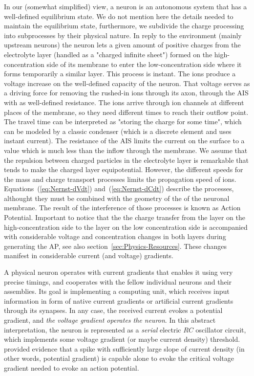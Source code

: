 In our (somewhat simplified) view, a neuron is an autonomous  system that has a well-defined equilibrium state. We do not mention here the details needed to maintain the equilibrium state,
furthermore, we subdivide the charge processing into subprocesses by their physical nature.
In reply to the environment (mainly upstream neurons) the neuron lets a given amount of positive charges from the electrolyte layer (handled as a "charged infinite sheet")
formed on the high-concentration side of its membrane to enter the low-concentration side where it forms temporarily a similar layer. This process is instant.
The ions produce a voltage increase on the well-defined
capacity of the neuron. That voltage serves as a driving force 
for removing the rushed-in ions through its axon, through the 
\gls{AIS}
with as well-defined resistance. The ions arrive through
ion channels at different places of the membrane, so they need
different times to reach their outflow point.
The travel time can be interpreted as "storing the charge for some time", which can be modeled by a classic condenser (which is a discrete element and uses instant current).
The resistance 
of the
\gls{AIS}
limits the current on the surface to a value which is much less
than the inflow through the membrane. We assume that the repulsion between charged particles in the electrolyte layer
is remarkable that tends to make the charged layer equipotential.
However, the different speeds for the mass and charge transport processes limits the propagation speed of ions.
Equations~(\ref{eq:Nernst-dVdt}) and~(\ref{eq:Nernst-dCdt}) describe the processes, althought they must be combined with the geometry of the of the neuronal membrane.
The result of the interference of those processes is known
as Action Potential.
Important to notice that the the charge transfer from the layer on the high-concentration side to the layer on the low concentration side is accompanied with considerable voltage and concentration  changes in both layers during generating the
\gls{AP},
see also section~\ref{sec:Physics-Resources}.
These changes manifest in considerable current (and voltage) gradients.


A physical neuron operates with current gradients that enables it using very precise timings,
and cooperates with the fellow individual neurons and their assemblies.
Its goal is implementing a computing unit, which receives input information
in form of native current gradients or artificial 
current gradients through its synapses. In any case, the received current evokes a potential gradient,
and \textit{the voltage gradient operates the neuron}.
In this abstract interpretation,
the neuron is represented as a \textit{serial} electric $RC$ oscillator circuit, which implements some 
voltage gradient (or maybe current density) threshold.
\cite{LosonczyIntegrative:2006} provided evidence that a spike with sufficiently large slope of current density
(in other words, potential gradient)
is capable alone to evoke the critical voltage gradient needed
to evoke an action potential. 


